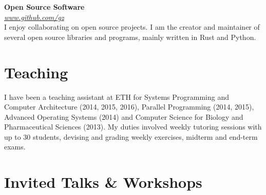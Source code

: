 \documentclass[margin,line]{cv/cv}
\begin{document}
\begin{resume}
    \textbf{Open Source Software} \\\vspace{1mm}%
    \textsl{\url{www.github.com/gz}} \hfill \\
    I enjoy collaborating on open source projects. I am the creator and maintainer
    of several open source libraries and programs, mainly written in Rust and
    Python.

    \section{\mysidestyle Teaching}

    I have been a teaching assistant at ETH for Systems Programming and Computer
    Architecture (2014, 2015, 2016), Parallel Programming (2014, 2015), Advanced
    Operating Systems (2014) and Computer Science for Biology and Pharmaceutical
    Sciences (2013). My duties involved weekly tutoring sessions with up to 30
    students, devising and grading weekly exercises, midterm and end-term exams.

    \pagebreak

    \section{\mysidestyle Invited Talks \& Workshops}


\end{resume}
\end{document}
